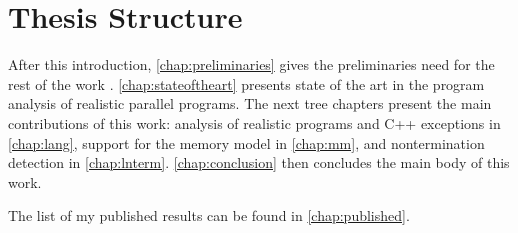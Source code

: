 \section{Thesis Structure}

After this introduction, \autoref{chap:preliminaries} gives the preliminaries
need for the rest of the work .
\autoref{chap:stateoftheart} presents state of the art in the program analysis
of realistic parallel programs.
The next tree chapters present the main contributions of this work: analysis of
realistic programs and C++ exceptions in \autoref{chap:lang}, support for the
\xtso memory model in \autoref{chap:mm}, and nontermination detection in
\autoref{chap:lnterm}.
\autoref{chap:conclusion} then concludes the main body of this work.

The list of my published results can be found in \autoref{chap:published}.

